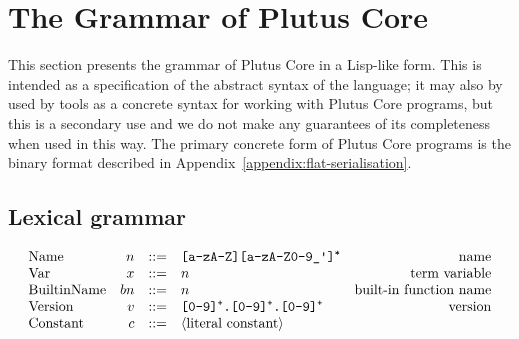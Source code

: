 \section{The Grammar of Plutus Core}
\label{sec:untyped-plc-grammar}
This section presents the grammar of Plutus Core in a Lisp-like form.  This is
intended as a specification of the abstract syntax of the language; it may also
by used by tools as a concrete syntax for working with Plutus Core programs, but
this is a secondary use and we do not make any guarantees of its completeness
when used in this way.  The primary concrete form of Plutus Core programs is the
binary format described in Appendix~\ref{appendix:flat-serialisation}.

\subsection{Lexical grammar}
\label{sec:untyped-plc}
\thispagestyle{plain}
\pagestyle{plain}

\begin{minipage}{\linewidth}
    \centering
    \[\begin{array}{lrclr}

        \textrm{Name}        & n      & ::= & \texttt{[a-zA-Z][a-zA-Z0-9\_\textquotesingle]\textsuperscript{*}}   & \textrm{name}\\

        \textrm{Var}           & x      & ::= & n & \textrm{term variable}\\
        \textrm{BuiltinName}   & bn     & ::= & n & \textrm{built-in function name}\\
        \textrm{Version} & v & ::= & \texttt{[0-9]\textsuperscript{+}.[0-9]\textsuperscript{+}.[0-9]\textsuperscript{+}}& \textrm{version}\\

        \textrm{Constant} & c & ::= & \langle{\textrm{literal constant}}\rangle& \\

    \end{array}\]
    \label{fig:lexical-grammar-untyped}
\end{minipage}%
%
%
%
%
%
%



